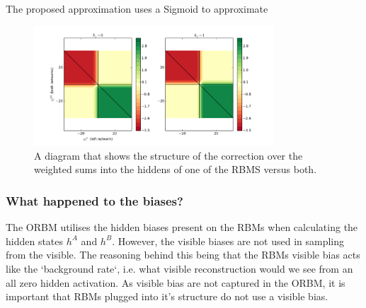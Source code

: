 The proposed approximation uses a Sigmoid to approximate

\begin{figure}[h]
\begin{center}
  \includegraphics[width = 0.8\textwidth]{Assets/correction.png}
\caption{A diagram that shows the structure of the correction over the weighted sums into the hiddens of one of the RBMS versus both.}
\label{F:Correction-Plot}
\end{center}
\end{figure}

\subsubsection{What happened to the biases?}

The ORBM utilises the hidden biases present on the RBMs when calculating the hidden states $h^A$ and $h^B$. However, the visible biases are not used in sampling from the visible. The reasoning behind this being that the RBMs visible bias acts like the `background rate`, i.e. what visible reconstruction would we see from an all zero hidden activation. As visible bias are not captured in the ORBM, it is important that RBMs plugged into it's structure do not use a visible bias.



